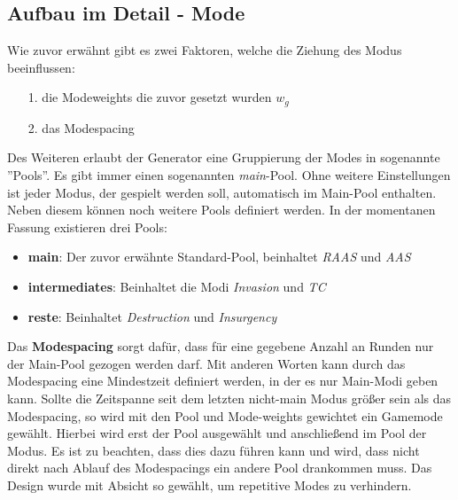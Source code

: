     \subsection{Aufbau im Detail - Mode}
        Wie zuvor erwähnt gibt es zwei Faktoren, welche die Ziehung des Modus beeinflussen:
        \begin{itemize}
            \item [1.] die Modeweights die zuvor gesetzt wurden $w_g$ 
            \item [2.] das Modespacing
        \end{itemize}
        Des Weiteren erlaubt der Generator eine Gruppierung der Modes in sogenannte ''Pools''. 
        Es gibt immer einen sogenannten \textit{main}-Pool. 
        Ohne weitere Einstellungen ist jeder Modus, der gespielt werden soll, automatisch im Main-Pool enthalten. 
        Neben diesem können noch weitere Pools definiert werden. 
        In der momentanen Fassung existieren drei Pools:
        \begin{itemize}
            \item \textbf{main}: Der zuvor erwähnte Standard-Pool, beinhaltet \textit{RAAS} und \textit{AAS}
            \item \textbf{intermediates}: Beinhaltet die Modi \textit{Invasion} und \textit{TC}
            \item \textbf{reste}: Beinhaltet \textit{Destruction} und \textit{Insurgency}
        \end{itemize}
        Das \textbf{Modespacing} sorgt dafür, dass für eine gegebene Anzahl an Runden nur der Main-Pool gezogen werden darf.
        Mit anderen Worten kann durch das Modespacing eine Mindestzeit definiert werden, in der es nur Main-Modi geben kann. 
        Sollte die Zeitspanne seit dem letzten nicht-main Modus größer sein als das Modespacing, so wird mit den Pool und Mode-weights gewichtet ein Gamemode gewählt. 
        Hierbei wird erst der Pool ausgewählt und anschließend im Pool der Modus. 
        Es ist zu beachten, dass dies dazu führen kann und wird, dass nicht direkt nach Ablauf des Modespacings ein andere Pool drankommen muss. 
        Das Design wurde mit Absicht so gewählt, um repetitive Modes zu verhindern.


